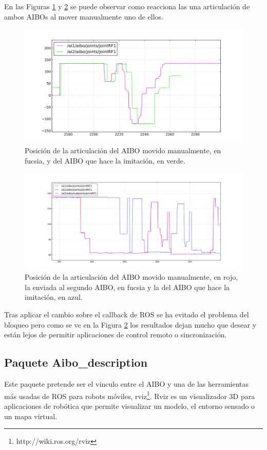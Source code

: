 \documentclass[12pt,a4paper,final,twoside]{article}
\begin{document}
En las Figuras \ref{fig:resumimic} y \ref{fig:resumimic2} se puede observar como reacciona las una articulación de ambos AIBOs al mover manualmente uno de ellos. 
\begin{figure}[H]
	\centering
    \includegraphics[scale=0.655]{images/mimic/retmin2.png}
	 \caption{Posición de la articulación del AIBO movido manualmente, en fucsia, y del AIBO que hace la imitación, en verde.}
  \label{fig:resumimic}
\end{figure}
\begin{figure}[H]
	\centering
    \includegraphics[scale=0.41]{images/mimic/malo5hz.png}
	 \caption{Posición de la articulación del AIBO movido manualmente, en rojo, la enviada al segundo AIBO, en fucsia y la del AIBO que hace la imitación, en azul.}
  \label{fig:resumimic2}
\end{figure}


Tras aplicar el cambio sobre el callback de ROS se ha evitado el problema del bloqueo pero como se ve en la Figura \ref{fig:resumimic2} los resultados dejan mucho que desear y están lejos de permitir aplicaciones de control remoto o sincronización. 

\subsection{Paquete Aibo{\_}description }
Este paquete pretende ser el vinculo entre el AIBO y una de las herramientas más usadas de ROS para robots móviles, rviz\footnote{http://wiki.ros.org/rviz}. Rviz es un visualizador 3D para aplicaciones de robótica que permite visualizar un modelo, el entorno sensado o un mapa virtual. 
\end{document}
